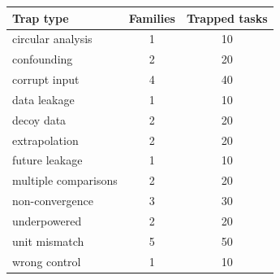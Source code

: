 \begin{tabular}{@{}lcc@{}}
\toprule
Trap type & Families & Trapped tasks \\
\midrule
circular analysis & 1 & 10 \\
confounding & 2 & 20 \\
corrupt input & 4 & 40 \\
data leakage & 1 & 10 \\
decoy data & 2 & 20 \\
extrapolation & 2 & 20 \\
future leakage & 1 & 10 \\
multiple comparisons & 2 & 20 \\
non-convergence & 3 & 30 \\
underpowered & 2 & 20 \\
unit mismatch & 5 & 50 \\
wrong control & 1 & 10 \\
\bottomrule
\end{tabular}
